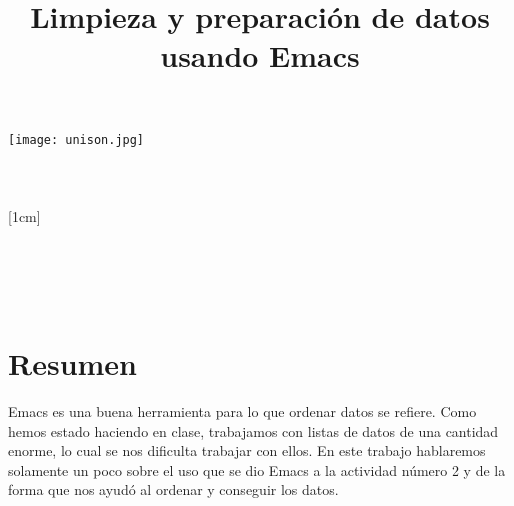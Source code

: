 \documentclass[a4paper,12pt]{article}
\title{Limpieza y preparación de datos usando Emacs}
\author{}
\newcommand{\vacio}{\textcolor{white}{holacaracola}}
\newcommand{\director}{Carlos Lizárraga Celaya}
\begin{document}
\begin{titlepage}
\begin{center}
\vspace{1cm}

\texttt{[image: unison.jpg]}
\\[0.5cm]
{\fontsize{24}{6}\selectfont{UNIVERSIDAD DE SONORA}}\\
[1em]
{\fontsize{16}{5}\selectfont{DEPARTAMENTO DE FÍSICA}}\\
[4em]
\textcolor{azulportada}
{\fontsize{30}{5}\selectfont{\textsc{\thetitle}}}\\
[1cm]
{\fontsize{16}{5}\selectfont{Alumno:}}\\
[0.2cm]
{\fontsize{14}{5}\selectfont{Luis Alfonso Torres Flores}}\\
[1cm]
{\fontsize{16}{5}\selectfont{Profesor}}\\
[0.2cm]
{\fontsize{16}{5}\selectfont{\director}}\\
[4.5cm]
{\fontsize{14}{5}\selectfont{07 de Febrero de 2017}}\\
[4cm]
\end{center}
\restoregeometry
\end{titlepage}

\newpage
\renewcommand{\headrulewidth}{0.5pt}
\fancyhead[L]{\vacio}

\newpage
\tableofcontents
\newpage

\section{Resumen}
Emacs es una buena herramienta para lo que ordenar datos se refiere. Como hemos estado haciendo en clase, trabajamos con listas de datos de una cantidad enorme, lo cual se nos dificulta trabajar con ellos. En este trabajo hablaremos solamente un poco sobre el uso que se dio Emacs a la actividad número 2 y de la forma que nos ayudó al ordenar y conseguir los datos.
\end{document}
